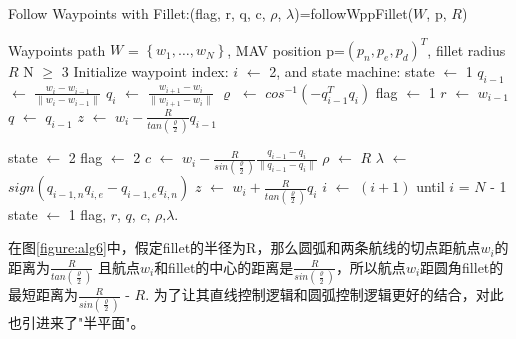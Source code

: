     \begin{algorithm}[h]
            \caption{Follow Waypoints with Fillet:(flag, r, q, c, $\rho$, $\lambda$)=followWppFillet($\textit{W}$, p, $R$)}
            \label{algo6:ref}
            \begin{algorithmic}[1]
                \ENSURE Waypoints path $\textit{W}$ = $\left\{ w_{1}, \dots, w_{N} \right\}$, MAV position p=$(p_{n}, p_{e}, p_{d})^{T}$, fillet radius $R$
                \REQUIRE N $\geq$ 3
                    \STATE Initialize waypoint index: $i$ $\gets$ 2, and state machine: state $\gets$ 1
                \ENDIF
                \STATE $q_{i-1}$ $\gets$ $\frac{w_{i}-w_{i-1}}{\lVert w_{i}-w_{i-1} \rVert}$
                \STATE $q_{i}$ $\gets$ $\frac{w_{i+1}-w_{i}}{\lVert w_{i+1}-w_{i} \rVert}$
                \STATE $\varrho$ $\gets$ $cos^{-1}(-q_{i-1}^{T}q_{i})$
                    \STATE flag $\gets$ 1
                    \STATE $r$ $\gets$ $w_{i-1}$
                    \STATE $q$ $\gets$ $q_{i-1}$
                    \STATE $z$ $\gets$ $w_{i} - \frac{R}{tan(\frac{\varrho}{2})}q_{i-1}$

                        \STATE state $\gets$ 2
                    \ENDIF
                    \STATE flag $\gets$ 2
                    \STATE $c$ $\gets$ $w_{i} - \frac{R}{sin(\frac{\varrho}{2})}\frac{q_{i-1}-q_{i}}{\lVert q_{i-1}-q_{i} \rVert}$
                    \STATE $\rho$ $\gets$ $R$
                    \STATE $\lambda$ $\gets$ $sign(q_{i-1,n}q_{i,e}-q_{i-1,e}q_{i,n})$
                    \STATE $z$ $\gets$ $w_{i} + \frac{R}{tan(\frac{\varrho}{2})}q_{i}$
                        \STATE $i$ $\gets$ $\left(i+1\right)$ until $i$ = $N$ - 1
                        \STATE state $\gets$ 1
                    \ENDIF
                \ENDIF
                \RETURN flag, $r$, $q$, $c$, $\rho$,$\lambda$.  %
            \end{algorithmic}
        \end{algorithm}
在图\ref{figure:alg6}中，假定fillet的半径为R，那么圆弧和两条航线的切点距航点$w_{i}$的距离为$\frac{R}{tan(\frac{\varrho}{2})}$
    且航点$w_{i}$和fillet的中心的距离是$\frac{R}{sin(\frac{\varrho}{2})}$，所以航点$w_{i}$距圆角fillet的最短距离为$\frac{R}{sin(\frac{\varrho}{2})}$ - $R$.
    为了让其直线控制逻辑和圆弧控制逻辑更好的结合，对此也引进来了"半平面"。
